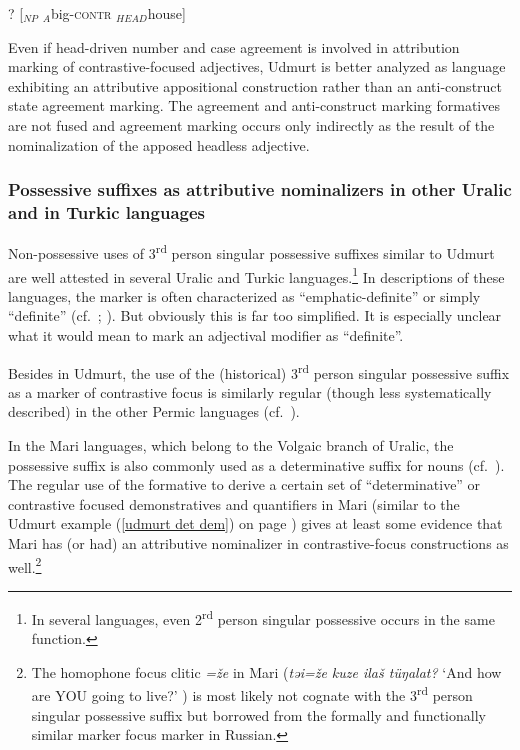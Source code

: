 \begin{exe}
\ex ? [$_{NP}$ $_{A}$big-\textsc{contr} $_{HEAD}$house]
\label{udmurt notapposition}
\end{exe}
Even if head-driven number and case agreement is involved in attribution marking of contrastive-focused adjectives, Udmurt is better analyzed as language exhibiting an attributive appositional construction rather than an anti-construct state agreement marking. The agreement and anti-construct marking formatives are not fused and agreement marking occurs only indirectly as the result of the nominalization of the apposed headless adjective.

\subsubsection[Possessive suffixes as attributive nominalizers]{Possessive suffixes as attributive nominalizers in other Uralic and in Turkic languages}

Non-possessive uses of 3\textsuperscript{rd} person singular possessive suffixes similar to Udmurt are well attested in several Uralic and Turkic languages.\footnote{In several languages, even 2\textsuperscript{rd} person singular possessive occurs in the same function.} In descriptions of these languages, the marker is often characterized as “emphatic-definite” or simply “definite” (cf.~\citealt[148]{tauli1966}; \citealt{kunnap2004}). But obviously this is far too simplified. It is especially unclear what it would mean to mark an adjectival modifier as “definite”.

Besides in Udmurt, the use of the (historical) 3\textsuperscript{rd} person singular possessive suffix as a marker of contrastive focus is similarly regular (though less systematically described) in the other Permic languages (cf.~\citealt[67]{serebrennikov1963}). %

In the Mari languages, which belong to the Volgaic branch of Uralic, the possessive suffix is also commonly used as a determinative suffix for nouns (cf.~\citealt[75–76]{alhoniemi1993}). The regular use of the formative to derive a certain set of “determinative” or contrastive focused demonstratives and quantifiers in Mari (similar to the Udmurt example (\ref{udmurt det dem}) on page \pageref{udmurt det dem}) gives at least some evidence that Mari has (or had) an attributive nominalizer in contrastive-focus constructions as well.\footnote{The homophone focus clitic \textit{=že} in Mari (\textit{təi=že kuze ilaš tüŋalat?} ‘And how are YOU going to live?’ \citealt[80]{alhoniemi1993}) is most likely not cognate with the 3\textsuperscript{rd} person singular possessive suffix but borrowed from the formally and functionally similar marker focus marker in Russian.}%

